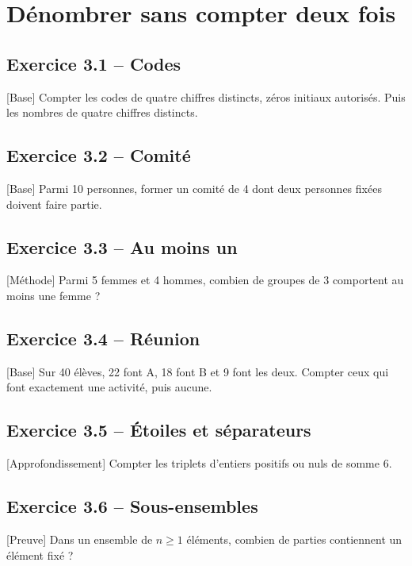 \chapter{Dénombrer sans compter deux fois}
\section*{Exercice 3.1 -- Codes}
[Base] Compter les codes de quatre chiffres distincts, zéros initiaux autorisés. Puis les nombres de quatre chiffres distincts.

\section*{Exercice 3.2 -- Comité}
[Base] Parmi 10 personnes, former un comité de 4 dont deux personnes fixées doivent faire partie.

\section*{Exercice 3.3 -- Au moins un}
[Méthode] Parmi 5 femmes et 4 hommes, combien de groupes de 3 comportent au moins une femme ?

\section*{Exercice 3.4 -- Réunion}
[Base] Sur 40 élèves, 22 font A, 18 font B et 9 font les deux. Compter ceux qui font exactement une activité, puis aucune.

\section*{Exercice 3.5 -- Étoiles et séparateurs}
[Approfondissement] Compter les triplets d'entiers positifs ou nuls de somme 6.

\section*{Exercice 3.6 -- Sous-ensembles}
[Preuve] Dans un ensemble de $n\ge1$ éléments, combien de parties contiennent un élément fixé ?
